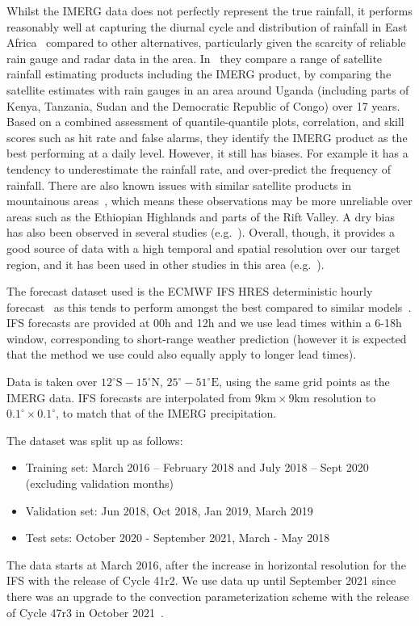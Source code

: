 \documentclass{article}
\begin{document}
Whilst the IMERG data does not perfectly represent the true rainfall, it performs reasonably well at capturing the diurnal cycle and distribution of rainfall in East Africa~\citep{dezfuli_validation_2017, roca_comparing_2010, camberlin_major_2018} compared to other alternatives, particularly given the scarcity of reliable rain gauge and radar data in the area.  In~\cite{ageet_validation_2022} they compare a range of satellite rainfall estimating products including the IMERG product, by comparing the satellite estimates with rain gauges in an area around Uganda (including parts of Kenya, Tanzania, Sudan and the Democratic Republic of Congo) over 17 years. Based on a combined assessment of quantile-quantile plots, correlation, and skill scores such as hit rate and false alarms, they identify the IMERG product as the best performing at a daily level. However, it still has biases. For example it has a tendency to underestimate the rainfall rate, and over-predict the frequency of rainfall. There are also known issues with similar satellite products in mountainous areas~\citep{dinku_comparison_2010}, which means these observations may be more unreliable over areas such as the Ethiopian Highlands and parts of the Rift Valley. A dry bias has also been observed in several studies (e.g.~\cite{vogel_skill_2018}). Overall, though, it provides a good source of data with a high temporal and spatial resolution over our target region, and it has been used in other studies in this area (e.g.~\cite{woodhams_what_2018, finney_implications_2019, cafaro_convection-permitting_2021}).

The forecast dataset used is the ECMWF IFS HRES deterministic hourly forecast~\citep{ecmwf_operational_2023} as this tends to perform amongst the best compared to similar models~\citep{haiden_intercomparison_2012}. IFS forecasts are provided at 00h and 12h and we use lead times within a 6-18h window, corresponding to short-range weather prediction (however it is expected that the method we use could also equally apply to longer lead times). 

Data is taken over $12^{\circ}\text{S}-15^{\circ}\text{N}$, $25^{\circ}-51^{\circ}\text{E}$, using the same grid points as the IMERG data. IFS forecasts are interpolated from $9\text{km} \times 9\text{km}$ resolution to $0.1^{\circ} \times 0.1^{\circ}$, to match that of the IMERG precipitation.

The dataset was split up as follows:
\begin{itemize}
    \item Training set: March 2016 – February 2018 and July 2018 – Sept 2020 (excluding validation months)
    \item Validation set: Jun 2018, Oct 2018, Jan 2019, March 2019
    \item Test sets: October 2020 - September 2021, March - May 2018
\end{itemize}
The data starts at March 2016, after the increase in horizontal resolution for the IFS with the release of Cycle 41r2. We use data up until September 2021 since there was an upgrade to the convection parameterization scheme with the release of Cycle 47r3 in October 2021~\cite{ecmwf_changes_2023}. 
\end{document}
